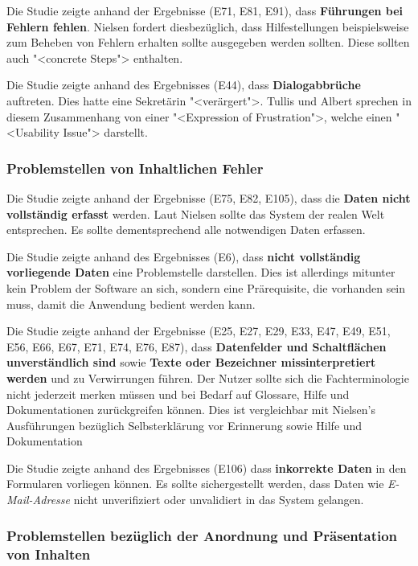 Die Studie zeigte anhand der Ergebnisse (E71, E81, E91), dass \textbf{Führungen bei Fehlern fehlen}. Nielsen fordert diesbezüglich, dass Hilfestellungen beispielsweise zum Beheben von Fehlern erhalten sollte ausgegeben werden sollten. Diese sollten auch "<concrete Steps"> enthalten. \cite{Nielsen10}

Die Studie zeigte anhand des Ergebnisses (E44), dass \textbf{Dialogabbrüche} auftreten. Dies hatte eine Sekretärin "<verärgert">. Tullis und Albert sprechen in diesem Zusammenhang von einer "<Expression of Frustration">, welche einen "<Usability Issue"> darstellt.\cite{TullisAlbert}

\subsubsection{Problemstellen von Inhaltlichen Fehler}
Die Studie zeigte anhand der Ergebnisse (E75, E82, E105), dass die \textbf{Daten nicht vollständig erfasst} werden. Laut Nielsen sollte das System der realen Welt entsprechen.\cite{Nielsen10} Es sollte dementsprechend alle notwendigen Daten erfassen.

Die Studie zeigte anhand des Ergebnisses (E6), dass \textbf{nicht vollständig vorliegende Daten} eine Problemstelle darstellen. Dies ist allerdings mitunter kein Problem der Software an sich, sondern eine Prärequisite, die vorhanden sein muss, damit die Anwendung bedient werden kann.

Die Studie zeigte anhand der Ergebnisse (E25, E27, E29, E33, E47, E49, E51, E56, E66, E67, E71, E74, E76, E87), dass \textbf{Datenfelder und Schaltflächen unverständlich sind} sowie \textbf{Texte oder Bezeichner missinterpretiert werden} und zu Verwirrungen führen. Der Nutzer sollte sich die Fachterminologie nicht jederzeit merken müssen und bei Bedarf auf Glossare, Hilfe und Dokumentationen zurückgreifen können. Dies ist vergleichbar mit Nielsen's Ausführungen bezüglich \glqq Selbsterklärung vor Erinnerung\grqq{} sowie \glqq Hilfe und Dokumentation\grqq{} \cite{Nielsen10}

Die Studie zeigte anhand des Ergebnisses (E106) dass \textbf{inkorrekte Daten} in den Formularen vorliegen können. Es sollte sichergestellt werden, dass Daten wie \textit{E-Mail-Adresse} nicht unverifiziert oder unvalidiert in das System gelangen.

\subsubsection{Problemstellen bezüglich der Anordnung und Präsentation von Inhalten}

